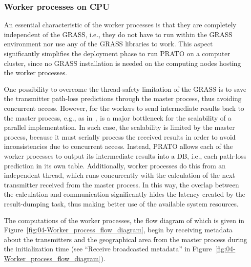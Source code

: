 \subsubsection{Worker processes on CPU}

An essential characteristic of the worker processes is that they are
completely independent of the GRASS, i.e., they do not have to run
within the GRASS environment nor use any of the GRASS libraries to
work. This aspect significantly simplifies the deployment phase to
run PRATO on a computer cluster, since no GRASS installation is needed
on the computing nodes hosting the worker processes.

One possibility to overcome the thread-safety limitation of the GRASS
is to save the transmitter path-loss predictions through the master
process, thus avoiding concurrent access. However, for the workers
to send intermediate results back to the master process, e.g., as
in~\cite{Akhter-GRASS_GIS_on_high_performance_computing_with_MPI_OpenMP_and_Ninf-G:2010,Huang-Explorations_of_the_implementation_of_a_parallel_IDW_algorithm_in_a_Linux_cluster:2011},
is a major bottleneck for the scalability of a parallel implementation.
In such case, the scalability is limited by the master process, because
it must serially process the received results in order to avoid inconsistencies
due to concurrent access. Instead, PRATO allows each of the worker
processes to output its intermediate results into a DB, i.e., each
path-loss prediction in its own table. Additionally, worker processes
do this from an independent thread, which runs concurrently with the
calculation of the next transmitter received from the master process.
In this way, the overlap between the calculation and communication
significantly hides the latency created by the result-dumping task,
thus making better use of the available system resources.

The computations of the worker processes, the flow diagram of which
is given in Figure~\ref{fig:04-Worker_process_flow_diagram}, begin
by receiving metadata about the transmitters and the geographical
area from the master process during the initialization time (see ``Receive
broadcasted metadata'' in Figure~\ref{fig:04-Worker_process_flow_diagram}).

